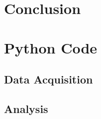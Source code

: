 \documentclass[%
reprint,
amsmath,amssymb,
aps,
]{revtex4-2}
\begin{document}
	\section{Conclusion}
		
		
	\clearpage
		
	\clearpage
	\appendix
		
	\section{Python Code}
	
		\subsection{Data Acquisition}
		
		\subsection{Analysis}
		
\end{document}
